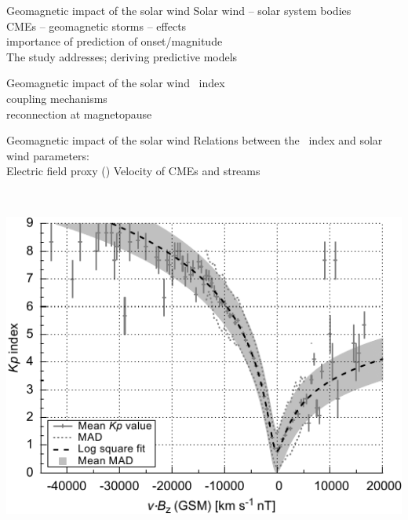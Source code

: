 \begin{frame}[plain,c]{Geomagnetic impact of the solar wind}{}
	Solar wind -- solar system bodies\\
	CMEs -- geomagnetic storms -- effects\\
	importance of prediction of onset/magnitude\\
	The study addresses; deriving predictive models
\end{frame}
\begin{frame}[plain,c]{Geomagnetic impact of the solar wind}{}
	\Kp~index\\
	coupling mechanisms\\
	reconnection at magnetopause
\end{frame}
\begin{frame}[plain,c]{Geomagnetic impact of the solar wind}{}
	Relations between the \Kp~index and solar wind parameters:\\
	Electric field proxy (\vBz{})	\hfill	Velocity of CMEs and streams\\\ 
	
	\begin{columns}[c]
		
		\includegraphics[width=\textwidth]{../figures_of_mine/chapter2/Kp_2dhistogram_VBzgsm_sws_fit_e.pdf}
		
	

\end{columns}
\end{frame}
